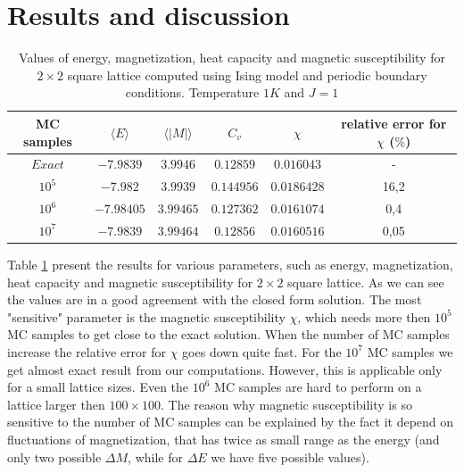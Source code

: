 \documentclass[a4paper]{article}
\begin{document}
\clearpage
\section {Results and discussion}\label{RD}
\begin{table}[h!]
  \caption{Values of energy, magnetization, heat capacity and magnetic susceptibility for $2\times 2$ square lattice computed using Ising model and periodic boundary conditions. Temperature $1K$ and $J=1$ }
  \label{tab:2x2_compare}
  \begin{center}
    \begin{tabular}{c|c|c|c|c|c}
    \hline
        MC samples & $\langle E\rangle$ & $\langle \left\vert M\right\vert \rangle$ & $C_{v}$ & $\chi$ & relative error for $\chi$ ($\%$) \\
        \hline
    $    Exact $ & $-7.9839$ & $ 3.9946 $ & $ 0.12859 $ & $ 0.016043 $ & - \\
    $    10^5 $  & $-7.982$ & $ 3.9939 $ & $ 0.144956 $ & $ 0.0186428 $ & 16,2 \\
    $    10^6 $  & $-7.98405$ & $ 3.99465 $ & $ 0.127362 $ & $ 0.0161074 $ & 0,4 \\
    $    10^7 $  & $-7.9839$ & $ 3.99464 $ & $ 0.12856 $ & $ 0.0160516 $ & 0,05 \\

    \end{tabular}
  \end{center}
\label{table: one}  
\end{table}
Table \ref{table: one} present the results for various parameters, such as energy, magnetization, heat capacity and magnetic susceptibility for $2\times 2$ square lattice. As we can see the values are in a good agreement with the closed form solution. The most "sensitive" parameter is the magnetic susceptibility $\chi$, which needs more then $10^5$ MC samples to get close to the exact solution. When the number of MC samples increase the relative error for $\chi$ goes down quite fast. For the $10^7$ MC samples we get almost exact result from our computations. However, this is applicable only for a small lattice sizes. Even the $10^6$ MC samples are hard to perform on a lattice larger then $100 \times 100$. 
The reason why magnetic susceptibility is so sensitive to the number of MC samples can be explained by the fact it depend on fluctuations of magnetization, that has twice as small range as the energy (and only two possible $\Delta M$, while for $\Delta E$ we have five possible values). \\
\end{document}
